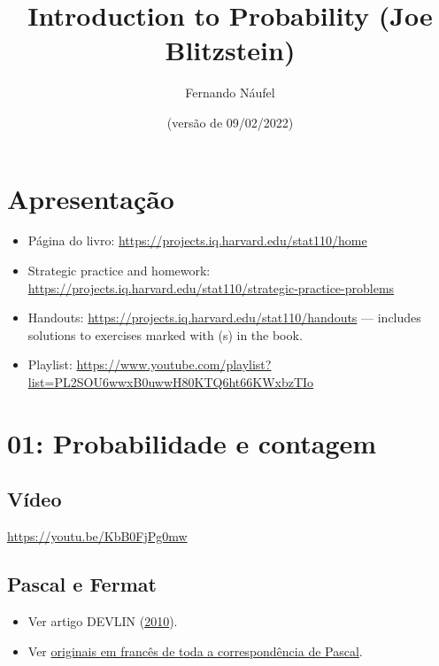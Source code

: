 \documentclass[
  11pt]{report}
\title{Introduction to Probability (Joe Blitzstein)}
\author{Fernando Náufel}
\date{(versão de 09/02/2022)}
\begin{document}
\maketitle

{
\setcounter{tocdepth}{1}
\tableofcontents
}
\hypertarget{apresentauxe7uxe3o}{%
\chapter*{Apresentação}\label{apresentauxe7uxe3o}}

\begin{itemize}
\item
  Página do livro: \url{https://projects.iq.harvard.edu/stat110/home}
\item
  Strategic practice and homework: \url{https://projects.iq.harvard.edu/stat110/strategic-practice-problems}
\item
  Handouts: \url{https://projects.iq.harvard.edu/stat110/handouts} --- includes solutions to exercises marked with (s) in the book.
\item
  Playlist: \url{https://www.youtube.com/playlist?list=PL2SOU6wwxB0uwwH80KTQ6ht66KWxbzTIo}
\end{itemize}

\hypertarget{probabilidade-e-contagem}{%
\chapter*{01: Probabilidade e contagem}\label{probabilidade-e-contagem}}

\hypertarget{vuxeddeo}{%
\section*{Vídeo}\label{vuxeddeo}}

\begin{center} \url{https://youtu.be/KbB0FjPg0mw} \end{center}

\hypertarget{pascal-e-fermat}{%
\section*{Pascal e Fermat}\label{pascal-e-fermat}}

\begin{itemize}
\item
  Ver artigo DEVLIN (\protect\hyperlink{ref-devlin-2010-pascal-fermat}{2010}).
\item
  Ver \href{https://gallica.bnf.fr/ark:/12148/bpt6k69975r.image.r=Blaise+Pascal.f233.langFR}{originais em francês de toda a correspondência de Pascal}.
\end{itemize}
\end{document}
